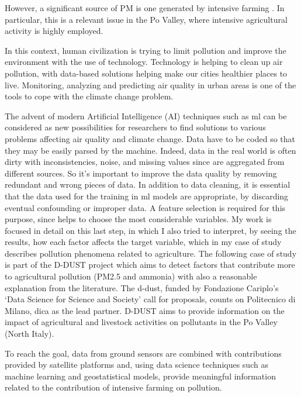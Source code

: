 However, a significant source of PM is one generated by intensive farming \cite{burkart2007diffuse}.
In particular, this is a relevant issue in the Po Valley, where intensive agricultural activity is highly employed.\par
In this context, human civilization is trying to limit pollution and improve the environment with the use of technology.\newline
Technology is helping to clean up air pollution, with data-based solutions helping make our cities healthier places to live.\newline
Monitoring, analyzing and predicting air quality in urban areas is one of the tools to cope with the climate change problem.\par
The advent of modern Artificial Intelligence (AI) techniques such as \gls{ml} can be considered as new possibilities for researchers to find solutions to various problems affecting air quality and climate change.
\bigskip
Data have to be coded so that they may be easily parsed by the machine. 
Indeed, data in the real world is often dirty with inconsistencies, noise, and missing values since are aggregated from different sources. So it's important to improve the data quality by removing redundant and wrong pieces of data.
In addition to data cleaning, it is essential that the data used for the training in \acrshort{ml} models are appropriate, by discarding eventual confounding or improper data.
A feature selection is required for this purpose, since helps to choose the most considerable variables.
My work is focused in detail on this last step, in which I also tried to interpret, by seeing the results, how each factor affects the target variable, which in my case of study describes pollution phenomena related to agriculture.
The following case of study is part of the D-DUST project which aims to detect factors that contribute more to agricultural pollution (PM2.5 and ammonia) with also a reasonable explanation from the literature.
The \gls{d-dust}, funded by Fondazione Cariplo’s ‘Data Science for Science and Society’ call for proposals, counts on Politecnico di Milano, \gls{dica} as the lead partner.\newline
D-DUST aims to provide information on the impact of agricultural and livestock activities on pollutants in the Po Valley (North Italy).\par 
To reach the goal, data from ground sensors are combined with contributions provided by satellite platforms and, using data science techniques such as machine learning and geostatistical models, provide meaningful information related to the contribution of intensive farming on pollution.\par
